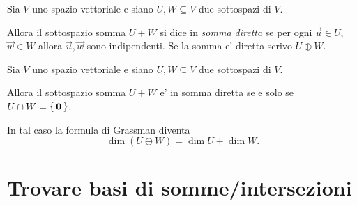 \begin{definition}
    Sia $V$ uno spazio vettoriale e siano $U, W \subseteq V$ due sottospazi di $V$. 
    
    Allora il sottospazio somma $U + W$ si dice in \emph{somma diretta} se per ogni $\vec u \in U$, $\vec w \in W$ allora $\vec u, \vec w$ sono indipendenti. Se la somma e' diretta scrivo $U \oplus W$.
\end{definition}

\begin{proposition}
    Sia $V$ uno spazio vettoriale e siano $U, W \subseteq V$ due sottospazi di $V$. 
    
    Allora il sottospazio somma $U + W$ e' in somma diretta se e solo se $U \cap W = \left\{\,\bm{0}\,\right\}$.

    In tal caso la formula di Grassman diventa \[
        \dim (U \oplus W) = \dim U + \dim W.    
    \]
\end{proposition}

\section{Trovare basi di somme/intersezioni}

